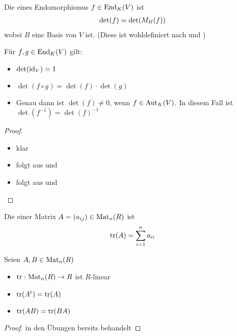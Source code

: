 \begin{definition}
	Die  eines Endomorphismus $f\in \operatorname{End}_K(V)$ ist 
	\begin{align}
		\det(f)=\det(M_B(f))\notag
	\end{align}
	wobei $B$ eine Basis von $V$ ist. (Diese ist wohldefiniert nach  und )
\end{definition}

\begin{proposition}
	Für $f,g\in \operatorname{End}_K(V)$ gilt:
	\begin{itemize}
		\item $\det(\operatorname{id}_V)=1$
		\item $\det(f\circ g)=\det(f)\cdot \det(g)$
		\item Genau dann ist $\det(f)\neq 0$, wenn $f\in \operatorname{Aut}_K(V)$. In diesem Fall ist $\det(f^{-1})=\det(f)^{-1}$
	\end{itemize}
\end{proposition}
\begin{proof}
	\begin{itemize}
		\item klar
		\item folgt aus  und 
		\item folgt aus  und 
	\end{itemize}
\end{proof}

\begin{definition}
	Die  einer Matrix $A=(a_{ij})\in \operatorname{Mat}_n(R)$ ist 
	\begin{align}
		\operatorname{tr}(A)=\sum_{i=1}^n a_{ii}\notag
	\end{align}
\end{definition}

\begin{lemma}
	Seien $A,B\in \operatorname{Mat}_n(R)$
	\begin{itemize}
		\item $\operatorname{tr}: \operatorname{Mat}_n(R)\to R$ ist $R$-linear
		\item $\operatorname{tr}(A^t)=\operatorname{tr}(A)$
		\item $\operatorname{tr}(AB)=\operatorname{tr}(BA)$
	\end{itemize}
\end{lemma}
\begin{proof}
	in den Übungen bereits behandelt
\end{proof}

